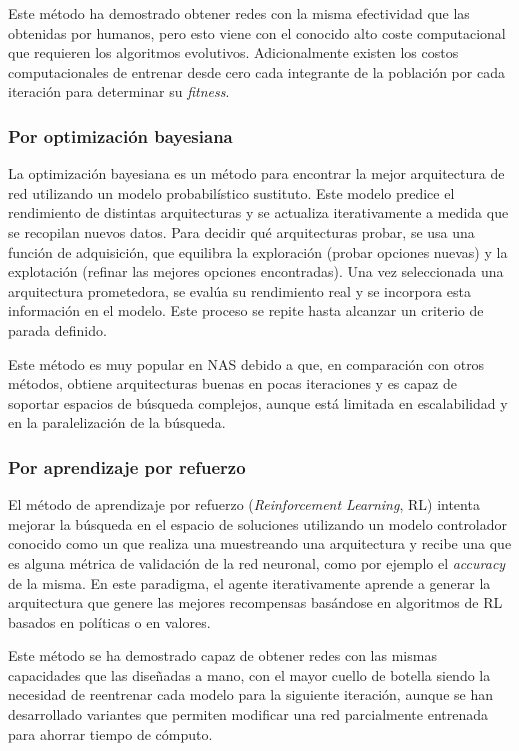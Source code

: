 Este método ha demostrado obtener redes con la misma efectividad que las obtenidas por humanos, pero esto viene con el conocido alto coste computacional que requieren los algoritmos evolutivos. Adicionalmente existen los costos computacionales de entrenar desde cero cada integrante de la población por cada iteración para determinar su \textit{fitness}.

\subsubsection{Por optimización bayesiana}
La optimización bayesiana es un método para encontrar la mejor arquitectura de red utilizando un modelo probabilístico sustituto. Este modelo predice el rendimiento de distintas arquitecturas y se actualiza iterativamente a medida que se recopilan nuevos datos. Para decidir qué arquitecturas probar, se usa una función de adquisición, que equilibra la exploración (probar opciones nuevas) y la explotación (refinar las mejores opciones encontradas). Una vez seleccionada una arquitectura prometedora, se evalúa su rendimiento real y se incorpora esta información en el modelo. Este proceso se repite hasta alcanzar un criterio de parada definido.

Este método es muy popular en NAS debido a que, en comparación con otros métodos, obtiene arquitecturas buenas en pocas iteraciones y es capaz de soportar espacios de búsqueda complejos, aunque está limitada en escalabilidad y en la paralelización de la búsqueda.

\subsubsection{Por aprendizaje por refuerzo}
El método de aprendizaje por refuerzo (\textit{Reinforcement Learning}, RL) intenta mejorar la búsqueda en el espacio de soluciones utilizando un modelo controlador conocido como un  que realiza una  muestreando una arquitectura y recibe una  que es alguna métrica de validación de la red neuronal, como por ejemplo el \textit{accuracy} de la misma. En este paradigma, el agente iterativamente aprende a generar la arquitectura que genere las mejores recompensas basándose en algoritmos de RL basados en políticas o en valores.

Este método se ha demostrado capaz de obtener redes con las mismas capacidades que las diseñadas a mano, con el mayor cuello de botella siendo la necesidad de reentrenar cada modelo para la siguiente iteración, aunque se han desarrollado variantes que permiten modificar una red parcialmente entrenada para ahorrar tiempo de cómputo.

